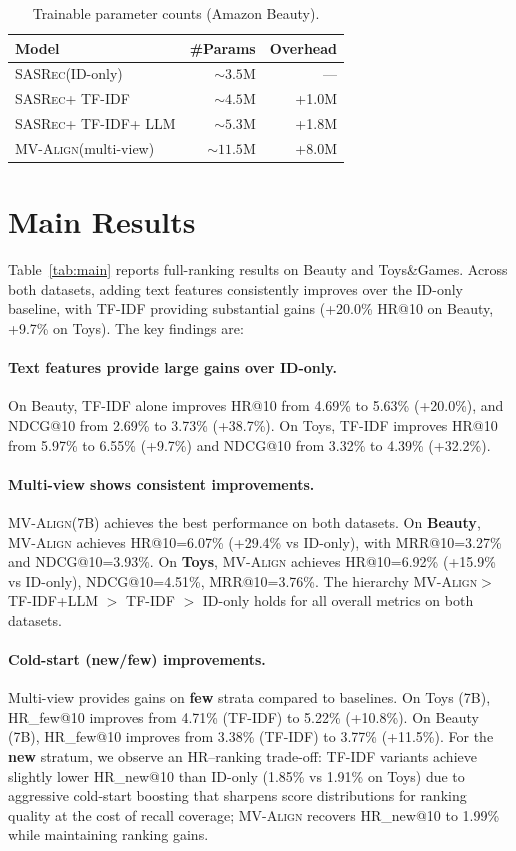 \documentclass[sigconf,natbib=true]{acmart}
\newcommand{\model}{\textsc{MV-Align}\xspace}
\newcommand{\base}{\textsc{SASRec}\xspace}
\newcommand{\tfidf}{\textsc{TF-IDF}\xspace}
\newcommand{\llm}{\textsc{LLM}\xspace}
\begin{document}
\begin{table}[h]
\caption{Trainable parameter counts (Amazon Beauty).}
\label{tab:params}
\centering
\small
\begin{tabular}{lrr}
\toprule
\textbf{Model} & \textbf{\#Params} & \textbf{Overhead} \\
\midrule
\base (ID-only) & ${\sim}3.5$M & --- \\
\base + \tfidf & ${\sim}4.5$M & +1.0M \\
\base + \tfidf + \llm & ${\sim}5.3$M & +1.8M \\
\model (multi-view) & ${\sim}11.5$M & +8.0M \\
\bottomrule
\end{tabular}
\end{table}

\section{Main Results}
Table~\ref{tab:main} reports full-ranking results on Beauty
and Toys\&Games. Across both datasets, adding text features
consistently improves over the ID-only baseline, with \tfidf
providing substantial gains (+20.0\% HR@10 on Beauty, +9.7\%
on Toys). The key findings are:

\paragraph{Text features provide large gains over ID-only.}
On Beauty, \tfidf alone improves HR@10 from 4.69\% to 5.63\%
(+20.0\%), and NDCG@10 from 2.69\% to 3.73\% (+38.7\%). On
Toys, \tfidf improves HR@10 from 5.97\% to 6.55\% (+9.7\%)
and NDCG@10 from 3.32\% to 4.39\% (+32.2\%).


\paragraph{Multi-view shows consistent improvements.}
\model (7B) achieves the best performance on both datasets.
On \textbf{Beauty}, \model achieves HR@10=6.07\% (+29.4\% vs
ID-only), with MRR@10=3.27\% and NDCG@10=3.93\%. On
\textbf{Toys}, \model achieves HR@10=6.92\% (+15.9\% vs
ID-only), NDCG@10=4.51\%, MRR@10=3.76\%. The hierarchy
\model $>$ TF-IDF+LLM $>$ TF-IDF $>$ ID-only holds for all
overall metrics on both datasets.

\paragraph{Cold-start (new/few) improvements.}
Multi-view provides gains on \textbf{few} strata compared
to baselines. On Toys (7B), HR\_few@10 improves from 4.71\%
(TF-IDF) to 5.22\% (+10.8\%). On Beauty (7B), HR\_few@10
improves from 3.38\% (TF-IDF) to 3.77\% (+11.5\%). For the
\textbf{new} stratum, we observe an HR--ranking trade-off:
TF-IDF variants achieve slightly lower HR\_new@10 than
ID-only (1.85\% vs 1.91\% on Toys) due to aggressive
cold-start boosting that sharpens score distributions for
ranking quality at the cost of recall coverage; \model
recovers HR\_new@10 to 1.99\% while maintaining ranking gains.
\end{document}
